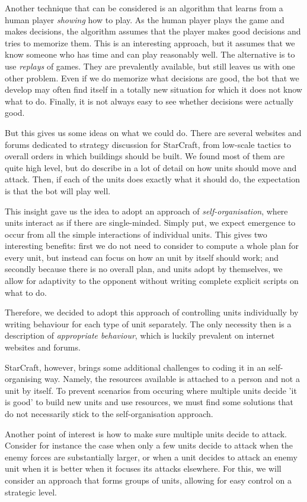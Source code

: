 Another technique that can be considered is an algorithm that learns from a human player \emph{showing} how to play. As the human player plays the game and makes decisions, the algorithm assumes that the player makes good decisions and tries to memorize them. This is an interesting approach, but it assumes that we know someone who has time and can play reasonably well. The alternative is to use \emph{replays} of games. They are prevalently available, but still leaves us with one other problem. Even if we do memorize what decisions are good, the bot that we develop may often find itself in a totally new situation for which it does not know what to do. Finally, it is not always easy to see whether decisions were actually good.

But this gives us some ideas on what we could do. There are several websites and forums dedicated to strategy discussion for StarCraft, from low-scale tactics to overall orders in which buildings should be built. We found most of them are quite high level, but do describe in a lot of detail on how units should move and attack. Then, if each of the units does exactly what it should do, the expectation is that the bot will play well.

This insight gave us the idea to adopt an approach of \emph{self-organisation}, where units interact as if there are single-minded. Simply put, we expect emergence to occur from all the simple interactions of individual units. This gives two interesting benefits: first we do not need to consider to compute a whole plan for every unit, but instead can focus on how an unit by itself should work; and secondly because there is no overall plan, and units adopt by themselves, we allow for adaptivity to the opponent without writing complete explicit scripts on what to do.

Therefore, we decided to adopt this approach of controlling units individually by writing behaviour for each type of unit separately. The only necessity then is a description of \emph{appropriate behaviour}, which is luckily prevalent on internet websites and forums.

StarCraft, however, brings some additional challenges to coding it in an self-organising way. Namely, the resources available is attached to a person and not a unit by itself. To prevent scenarios from occuring where multiple units decide 'it is good' to build new units and use resources, we must find some solutions that do not necessarily stick to the self-organisation approach.

Another point of interest is how to make sure multiple units decide to attack. Consider for instance the case when only a few units decide to attack when the enemy forces are substantially larger, or when a unit decides to attack an enemy unit when it is better when it focuses its attacks elsewhere. For this, we will consider an approach that forms groups of units, allowing for easy control on a strategic level.

